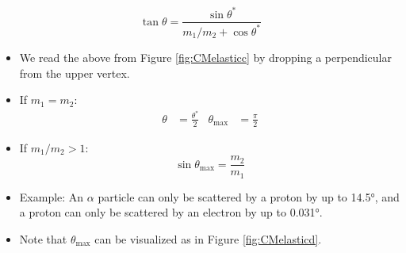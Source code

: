 \documentclass[../notes.tex]{subfiles}
\begin{document}
\begin{itemize}
\begin{itemize}
        \begin{equation*}
            \tan\theta = \frac{\sin\theta^*}{m_1/m_2+\cos\theta^*}
        \end{equation*}
        \begin{itemize}
            \item We read the above from Figure \ref{fig:CMelasticc} by dropping a perpendicular from the upper vertex.
            \item If $m_1=m_2$:
            \begin{align*}
                \theta &= \frac{\theta^*}{2}&
                \theta_\text{max} &= \frac{\pi}{2}
            \end{align*}
            \item If $m_1/m_2>1$:
            \begin{equation*}
                \sin\theta_\text{max} = \frac{m_2}{m_1}
            \end{equation*}
            \item Example: An $\alpha$ particle can only be scattered by a proton by up to \ang{14.5}, and a proton can only be scattered by an electron by up to \ang{0.031}.
            \item Note that $\theta_\text{max}$ can be visualized as in Figure \ref{fig:CMelasticd}.
        \end{itemize}
    \end{itemize}
\end{itemize}
\end{document}

